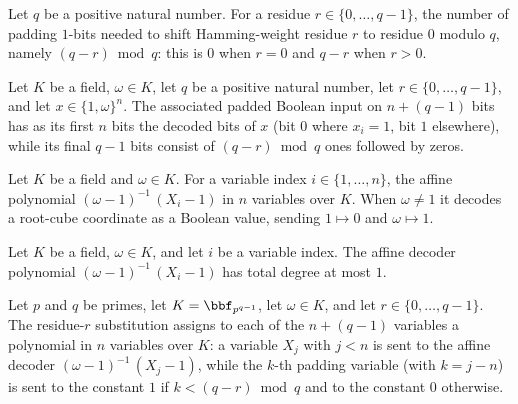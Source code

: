 \begin{definition}
\label{RazborovSmolensky.residuePadOnes}
\leanok
Let $q$ be a positive natural number.  For a residue $r \in \{0,\dots,q-1\}$, the number
of padding $1$-bits needed to shift Hamming-weight residue $r$ to residue $0$ modulo $q$,
namely $(q - r) \bmod q$: this is $0$ when $r = 0$ and $q - r$ when $r > 0$.
\end{definition}

\begin{definition}
\label{RazborovSmolensky.paddedResidueInput}
\leanok
{}
Let $K$ be a field, $\omega \in K$, let $q$ be a positive natural number, let
$r \in \{0,\dots,q-1\}$, and let $x \in \{1,\omega\}^n$.  The associated padded Boolean
input on $n + (q-1)$ bits has as its first $n$ bits the decoded bits of $x$ (bit $0$
where $x_i = 1$, bit $1$ elsewhere), while its final $q-1$ bits consist of
$(q - r) \bmod q$ ones followed by zeros.
\end{definition}

\begin{definition}
\label{RazborovSmolensky.rootAffineBoolPoly}
\leanok
Let $K$ be a field and $\omega \in K$.  For a variable index $i \in \{1,\dots,n\}$, the
affine polynomial $(\omega - 1)^{-1}\,(X_i - 1)$ in $n$ variables over $K$.  When
$\omega \neq 1$ it decodes a root-cube coordinate as a Boolean value, sending
$1 \mapsto 0$ and $\omega \mapsto 1$.
\end{definition}

\begin{theorem}
\label{RazborovSmolensky.rootAffineBoolPoly_totalDegree_le_one}
\leanok
{}
Let $K$ be a field, $\omega \in K$, and let $i$ be a variable index.  The affine decoder
polynomial $(\omega - 1)^{-1}\,(X_i - 1)$ has total degree at most $1$.
\end{theorem}

\begin{definition}
\label{RazborovSmolensky.paddedResidueSubst}
\leanok
{}
Let $p$ and $q$ be primes, let $K = \bbf_{p^{q-1}}$, let $\omega \in K$, and let
$r \in \{0,\dots,q-1\}$.  The residue-$r$ substitution assigns to each of the $n + (q-1)$
variables a polynomial in $n$ variables over $K$: a variable $X_j$ with $j < n$ is sent
to the affine decoder $(\omega - 1)^{-1}\,(X_j - 1)$, while the $k$-th padding variable
(with $k = j - n$) is sent to the constant $1$ if $k < (q - r) \bmod q$ and to the
constant $0$ otherwise.
\end{definition}

